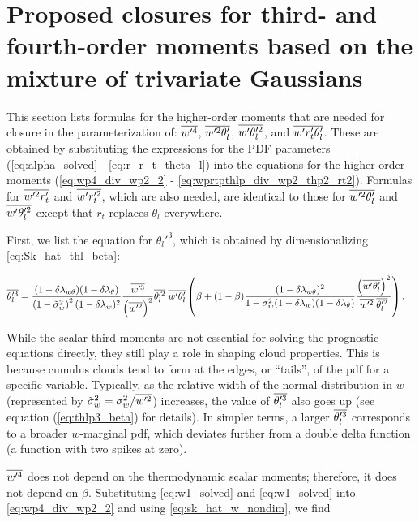 \section{Proposed closures for third- and fourth-order moments based on the mixture of trivariate Gaussians}\label{sec:prop_closure}

This section lists formulas for the higher-order moments that are needed for closure in the parameterization of: $\overline{w'^4}$, $\overline{w'^2 \theta_l'}$, $\overline{w' \theta_l'^2}$, and $\overline{w' r_t' \theta_l'}$.
These are obtained by substituting the expressions for the PDF parameters (\cref{eq:alpha_solved} - \cref{eq:r_r_t_theta_l}) into the equations for the higher-order moments (\cref{eq:wp4_div_wp2_2} - \cref{eq:wprtpthlp_div_wp2_thp2_rt2}).
Formulas for $\overline{w'^2 r_t'}$ and $\overline{w' r_t'^2}$, which are also needed, are identical to those for $\overline{w'^2 \theta_l'}$ and $\overline{w' \theta_l'^2}$ except that $r_t$ replaces $\theta_l$ everywhere.

First, we list the equation for $\theta_l'^3$, which is obtained by dimensionalizing \cref{eq:Sk_hat_thl_beta}:

\begin{align}
    \label{eq:thlp3_beta}
    \overline{\theta_l'^3}
    &= \frac{(1-\delta \lambda_{w \theta})(1-\delta \lambda_\theta)}{\left( 1 - \tilde{\sigma}_w^2 \right)^2 (1-\delta \lambda_w)^2} \frac{\overline{w'^3}}{\left( \overline{w'^2} \right)^2} \overline{\theta_l'^2} \; \overline{w'\theta_l'} \left(\beta + (1-\beta) \frac{(1-\delta \lambda_{w \theta})^2}{1-\tilde{\sigma}_w^2 (1-\delta \lambda_w)(1-\delta \lambda_\theta)} \frac{\left(\overline{w'\theta_l'}\right)^2}{\overline{w'^2} \; \overline{\theta_l'^2}}\right).
\end{align}

While the scalar third moments are not essential for solving the prognostic equations directly, they still play a role in shaping cloud properties.
This is because cumulus clouds tend to form at the edges, or \enquote{tails}, of the \gls{pdf} for a specific variable.
Typically, as the relative width of the normal distribution in $w$ (represented by ${\tilde{\sigma}_w}^2=\sigma_w^2/\overline{w'^2}$) increases, the value of $\overline{\theta_l'^3}$ also goes up (see equation (\ref{eq:thlp3_beta}) for details).
In simpler terms, a larger $\overline{\theta_l'^3}$ corresponds to a broader $w$-marginal \gls{pdf}, which deviates further from a double delta function (a function with two spikes at zero).

$\overline{w'^4}$ does not depend on the thermodynamic scalar moments;
therefore, it does not depend on $\beta$.
Substituting \cref{eq:w1_solved} and \cref{eq:w1_solved} into \cref{eq:wp4_div_wp2_2} and using \cref{eq:sk_hat_w_nondim}, we find

